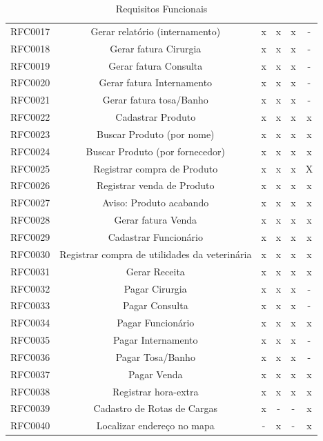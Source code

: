 \documentclass[12pt,openright,twoside,a4paper,english,french,spanish,brazil]{abntex2}
\begin{document}
\begin{table}[!htpb]
\begin{small}
\begin{tabular}{rccccc}
    RFC0017 & Gerar relatório (internamento) & x & x & x & - \\
    RFC0018 & Gerar fatura Cirurgia & x & x & x & - \\
    RFC0019 & Gerar fatura Consulta & x & x & x & - \\
    RFC0020 & Gerar fatura Internamento & x & x & x & - \\
    RFC0021 & Gerar fatura tosa/Banho & x & x & x & - \\
    RFC0022 & Cadastrar Produto & x & x & x & x \\
    RFC0023 & Buscar Produto (por nome) & x & x & x & x \\
    RFC0024 & Buscar Produto (por fornecedor) & x & x & x & x \\
    RFC0025 & Registrar compra de Produto & x & x & x & X \\
    RFC0026 & Registrar venda de Produto & x & x & x & x \\
    RFC0027 & Aviso: Produto acabando & x & x & x & x \\
    RFC0028 & Gerar fatura Venda & x & x & x & x \\
    RFC0029 & Cadastrar Funcionário & x & x & x & x \\
    RFC0030 & Registrar compra de utilidades da veterinária & x & x & x & x \\
    RFC0031 & Gerar Receita & x & x & x & x \\
    RFC0032 & Pagar Cirurgia & x & x & x & - \\
    RFC0033 & Pagar Consulta & x & x & x & - \\
    RFC0034 & Pagar Funcionário & x & x & x & x \\
    RFC0035 & Pagar Internamento & x & x & x & - \\
    RFC0036 & Pagar Tosa/Banho & x & x & x & - \\
    RFC0037 & Pagar Venda & x & x & x & x \\
    RFC0038 & Registrar hora-extra & x & x & x & x \\
    RFC0039 & Cadastro de Rotas de Cargas & x & - & - & x \\
    RFC0040 & Localizar endereço no mapa & - & x & - & x \\
    \bottomrule
    \end{tabular}%
  \label{tab:addlabel}%
\end{small}
\caption{Requisitos Funcionais}\label{tab_requisitosFuncionais}
\end{table}
\end{document}
